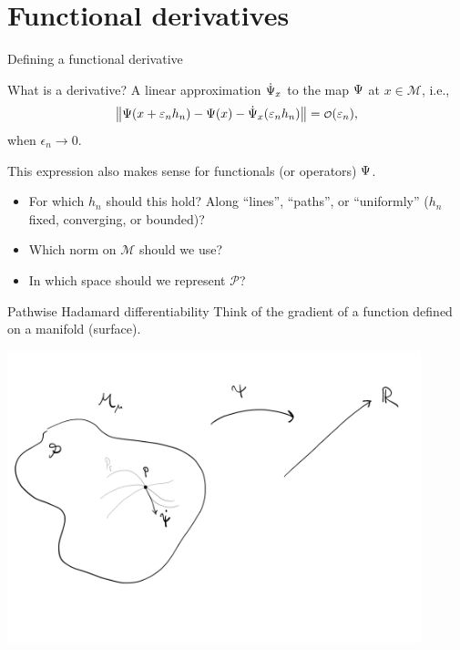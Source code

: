 \documentclass{beamer}\usepackage{listings}
\begin{document}
\section{Functional derivatives}
\label{sec:orgc685146}
\begin{frame}[label={sec:org6e2d2cc}]{Defining a functional derivative}
\begin{block}{What is a derivative? \pause}
A linear approximation \(\dot{\operatorname{\Psi}}_x\) to the map \(\operatorname{\Psi}\) at \(x \in \mathcal{M}\), i.e.,
\begin{equation*}
  \left\Vert
    \TT(x + \epsilon_n h_n) - \TT(x) - \dot{\TT}_x(\epsilon_n h_n)
  \right\Vert = \smallO(\epsilon_n),
\end{equation*}
when \(\epsilon_n \rightarrow 0\).

\pause \hfill
\end{block}
This expression also makes sense for functionals (or operators) \(\operatorname{\Psi}\).

\pause \hfill

\begin{itemize}[<+->]
\item For which \(h_n\) should this hold? Along ``lines'', ``paths'', or ``uniformly'' (\(h_n\) fixed,
converging, or bounded)?
\item Which norm on \(\mathcal{M}\) should we use?
\item In which space should we represent \(\mathcal{P}\)?
\end{itemize}
\end{frame}

\begin{frame}[label={sec:org92ecb98}]{Pathwise Hadamard differentiability}
Think of the gradient of a function defined on a manifold (surface).

\begin{center}
\includegraphics[width=0.9\textwidth]{./figures/pathwise-dif.pdf}
\end{center}
\end{frame}
\end{document}
